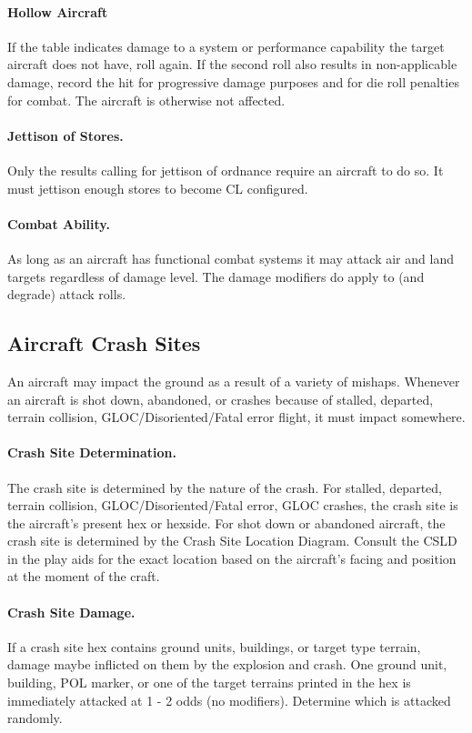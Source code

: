 \paragraph{Hollow Aircraft} If the table indicates damage to a system or performance capability the target aircraft does not have, roll again. If the second roll also results in non-applicable damage, record the hit for progressive damage purposes and for die roll penalties for combat. The aircraft is otherwise not affected.

\paragraph{Jettison of Stores.} Only the results calling for jettison of ordnance require an aircraft to do so. It must jettison enough stores to become CL configured.

\paragraph{Combat Ability.} As long as an aircraft has functional combat systems it may attack air and land targets regardless of damage level. The damage modifiers do apply to (and degrade) attack rolls.

\subsection{Aircraft Crash Sites}

An aircraft may impact the ground as a result of a variety of mishaps. Whenever an aircraft is shot down, abandoned, or crashes because of stalled, departed, terrain collision, GLOC/Disoriented/Fatal error flight, it must impact somewhere.

\paragraph{Crash Site Determination.} The crash site is determined by the nature of the crash. For stalled, departed, terrain collision, GLOC/Disoriented/Fatal error, GLOC crashes, the crash site is the aircraft's present hex or hexside. For shot down or abandoned aircraft, the crash site is determined by the Crash Site Location Diagram. Consult the CSLD in the play aids for the exact location based on the aircraft's facing and position at the moment of the craft.

\paragraph{Crash Site Damage.} If a crash site hex contains ground units, buildings, or target type terrain, damage maybe inflicted on them by the explosion and crash. One ground unit, building, POL marker, or one of the target terrains printed in the hex is immediately attacked at 1 - 2 odds (no modifiers). Determine which is attacked randomly.

